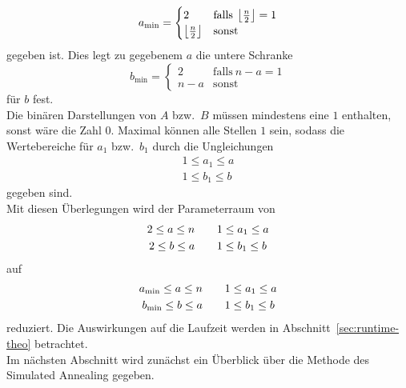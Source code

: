 \begin{equation}
		a_\mathrm{\min}=\begin{cases}
						2 & \mathrm{falls}\:\left\lfloor\frac{n}{2}\right\rfloor = 1 \\
						\left\lfloor\frac{n}{2}\right\rfloor & \mathrm{sonst}
		\end{cases}\label{eq:amin}
\end{equation}
gegeben ist. Dies legt zu gegebenem $a$ die untere Schranke
\begin{equation}
		b_\mathrm{\min}=\begin{cases}
						2 & \mathrm{falls}\:n-a=1 \\
						n-a & \mathrm{sonst}
		\end{cases}\label{eq:amax}
\end{equation}
für $b$ fest.\\
Die binären Darstellungen von $A$ bzw.\ $B$ müssen mindestens eine $1$ enthalten, sonst wäre die Zahl $0$. Maximal können alle Stellen $1$ sein, sodass die Wertebereiche für $a_1$ bzw.\ $b_1$ durch die Ungleichungen
\begin{align*}
		1\leq a_1\leq a \\
		1\leq b_1\leq b
\end{align*}
gegeben sind.\\
Mit diesen Überlegungen wird der Parameterraum von
\begin{align}
		2 \leq a \leq n &\quad\quad 1 \leq a_1 \leq a \notag \\
		2 \leq b \leq a &\quad\quad	1 \leq b_1 \leq b \label{eq:parameterspace1}
\end{align}
auf
\begin{align}
		a_\mathrm{\min} \leq a \leq n &\quad\quad	1 \leq a_1 \leq a \notag \\
		b_\mathrm{\min} \leq b \leq a &\quad\quad	1 \leq b_1 \leq b \label{eq:parameterspace2}
\end{align}
reduziert. Die Auswirkungen auf die Laufzeit werden in Abschnitt~\ref{sec:runtime-theo} betrachtet. \\
Im nächsten Abschnitt wird zunächst ein Überblick über die Methode des Simulated Annealing gegeben.



